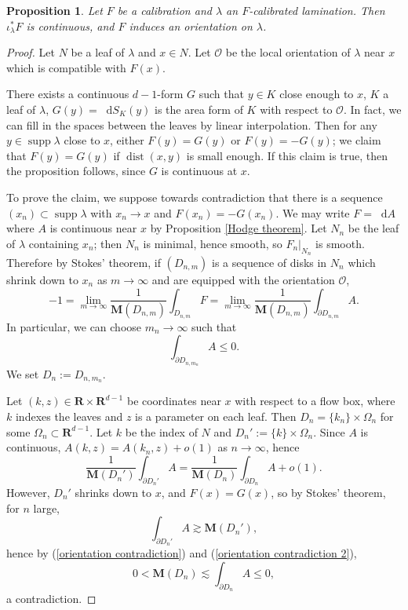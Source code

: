 \documentclass[reqno,11pt]{amsart}
\newcommand{\RR}{\mathbf{R}}
\newcommand*\dif{\mathop{}\!\mathrm{d}}
\DeclareMathOperator{\dist}{dist}
\DeclareMathOperator{\supp}{supp}
\newcommand{\Mass}{\mathbf M}
\newtheorem{proposition}[theorem]{Proposition}
\theoremstyle{definition}
\numberwithin{equation}{section}
\begin{document}
\begin{proposition}\label{calibrated implies oriented}
Let $F$ be a calibration and $\lambda$ an $F$-calibrated lamination.
Then $\iota_\lambda^* F$ is continuous, and $F$ induces an orientation on $\lambda$.
\end{proposition}
\begin{proof}
Let $N$ be a leaf of $\lambda$ and $x \in N$.
Let $\mathscr O$ be the local orientation of $\lambda$ near $x$ which is compatible with $F(x)$. 

There exists a continuous $d - 1$-form $G$ such that $y \in K$ close enough to $x$, $K$ a leaf of $\lambda$, $G(y) = \dif S_K(y)$ is the area form of $K$ with respect to $\mathscr O$.
In fact, we can fill in the spaces between the leaves by linear interpolation.
Then for any $y \in \supp \lambda$ close to $x$, either $F(y) = G(y)$ or $F(y) = -G(y)$; we claim that $F(y) = G(y)$ if $\dist(x, y)$ is small enough.
If this claim is true, then the proposition follows, since $G$ is continuous at $x$.

To prove the claim, we suppose towards contradiction that there is a sequence $(x_n) \subset \supp \lambda$ with $x_n \to x$ and $F(x_n) = -G(x_n)$.
We may write $F = \dif A$ where $A$ is continuous near $x$ by Proposition \ref{Hodge theorem}.
Let $N_n$ be the leaf of $\lambda$ containing $x_n$; then $N_n$ is minimal, hence smooth, so $F_n|_{N_n}$ is smooth.
Therefore by Stokes' theorem, if $(D_{n, m})$ is a sequence of disks in $N_n$ which shrink down to $x_n$ as $m \to \infty$ and are equipped with the orientation $\mathscr O$,
$$-1 = \lim_{m \to \infty} \frac{1}{\Mass(D_{n, m})} \int_{D_{n, m}} F = \lim_{m \to \infty} \frac{1}{\Mass(D_{n, m})} \int_{\partial D_{n, m}} A.$$
In particular, we can choose $m_n \to \infty$ such that 
\begin{equation}\label{orientation contradiction}
\int_{\partial D_{n, m_n}} A \leq 0.
\end{equation}
We set $D_n := D_{n, m_n}$.

Let $(k, z) \in \RR \times \RR^{d - 1}$ be coordinates near $x$ with respect to a flow box, where $k$ indexes the leaves and $z$ is a parameter on each leaf.
Then $D_n = \{k_n\} \times \Omega_n$ for some $\Omega_n \subset \RR^{d - 1}$.
Let $k$ be the index of $N$ and $D_n' := \{k\} \times \Omega_n$.
Since $A$ is continuous, $A(k, z) = A(k_n, z) + o(1)$ as $n \to \infty$, hence
\begin{equation}\label{orientation contradiction 2}
\frac{1}{\Mass(D_n')} \int_{\partial D_n'} A = \frac{1}{\Mass(D_n)} \int_{\partial D_n} A + o(1).
\end{equation}
However, $D_n'$ shrinks down to $x$, and $F(x) = G(x)$, so by Stokes' theorem, for $n$ large,
$$\int_{\partial D_n'} A \gtrsim \Mass(D_n'),$$
hence by (\ref{orientation contradiction}) and (\ref{orientation contradiction 2}),
$$0 < \Mass(D_n) \lesssim \int_{\partial D_n} A \leq 0,$$
a contradiction.
\end{proof}
\end{document}
